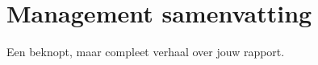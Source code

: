 
\hypertarget{management-samenvatting}{%
\section*{Management samenvatting}\label{management-samenvatting}}

Een beknopt, maar compleet verhaal over jouw rapport.
